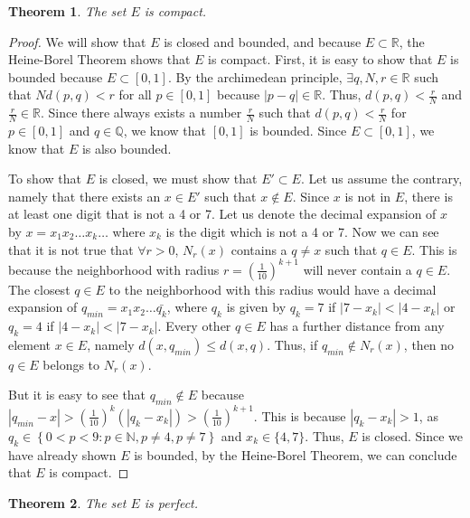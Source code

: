 \documentclass[psamsfonts]{amsart}
\newtheorem{thm}{Theorem}[section]
\theoremstyle{definition}
\theoremstyle{remark}
\numberwithin{equation}{section}
\begin{document}
\begin{thm}
The set $E$ is compact.
\end{thm}

\begin{proof}
We will show that $E$ is closed and bounded, and because $E \subset \mathbb{R}$, the Heine-Borel Theorem shows that $E$ is compact. First, it is easy to show that $E$ is bounded because $E \subset [0,1]$. By the archimedean principle, $\exists q,N,r \in \mathbb{R}$ such that $N d(p,q) < r$ for all $p \in [0,1]$ because $|p-q| \in \mathbb{R}$. Thus, $d(p,q) < \frac{r}{N}$ and $\frac{r}{N} \in \mathbb{R}$. Since there always exists a number $\frac{r}{N}$ such that $d(p,q) < \frac{r}{N}$ for $p \in [0,1]$ and $q \in \mathbb{Q}$, we know that $[0,1]$ is bounded. Since $E \subset [0,1]$, we know that $E$ is also bounded.

To show that $E$ is closed, we must show that $E' \subset E$. Let us assume the contrary, namely that there exists an $x \in E'$ such that $x \notin E$. Since $x$ is not in $E$, there is at least one digit that is not a 4 or 7. Let us denote the decimal expansion of $x$ by $ x = x_1 x_2 \ldots x_k \ldots$ where $x_k$ is the digit which is not a 4 or 7. Now we can see that it is not true that $\forall r>0$, $N_r(x)$ contains a $q \neq x$ such that $q \in E$. This is because the neighborhood with radius $r = \left(\frac{1}{10} \right)^{k+1}$ will never contain a $q \in E$. The closest $q \in E$ to the neighborhood with this radius would have a decimal expansion of $ q_{min} = x_1 x_2 \ldots \bar{q_k}$, where $q_k$ is given by $q_k = 7$ if $|7-x_k|< |4-x_k|$ or $q_k = 4$ if $|4-x_k| < |7-x_k|$. Every other $q \in E$ has a further distance from any element $x \in E$, namely $d(x,q_{min}) \leq d(x,q)$. Thus, if $q_{min} \notin N_r(x)$, then no $q \in E$ belongs to $N_r(x)$. 

But it is easy to see that $q_{min} \notin E$ because $ |q_{min} - x| > \left(\frac{1}{10}\right)^{k} ( |q_k - x_k|) > \left( \frac{1}{10} \right)^{k+1}$. This is because $|q_k - x_k| > 1$, as $q_k \in \left\{ 0<p<9: p \in \mathbb{N}, p \neq 4, p \neq 7 \right\} $ and $x_k \in \{4,7\}$. Thus, $E$ is closed. Since we have already shown $E$ is bounded, by the Heine-Borel Theorem, we can conclude that $E$ is compact.
\end{proof}

\begin{thm}
The set $E$ is perfect.
\end{thm}
\end{document}
